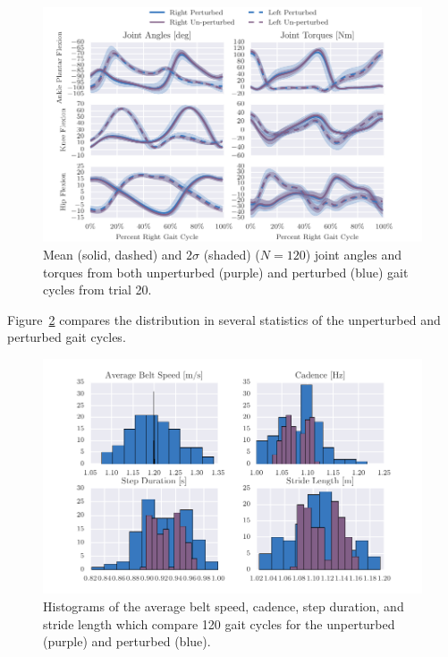 \documentclass{article}
\begin{document}
\begin{figure}
  \includegraphics{figures/unperturbed-perturbed-comparison.pdf}
  \caption{Mean (solid, dashed) and $2\sigma$ (shaded) ($N=120$) joint angles
    and torques from both unperturbed (purple) and perturbed (blue) gait cycles
    from trial 20.}
  \label{fig:angle-torque-comparison}
\end{figure}

Figure~\ref{fig:gait-cycle-stats-comparison} compares the distribution in
several statistics of the unperturbed and perturbed gait cycles.

\begin{figure}
  \includegraphics{figures/unperturbed-perturbed-hist-comparison.pdf}
  \caption{Histograms of the average belt speed, cadence, step duration, and
    stride length which compare 120 gait cycles for the unperturbed (purple)
    and perturbed (blue).}
  \label{fig:gait-cycle-stats-comparison}
\end{figure}
\end{document}
